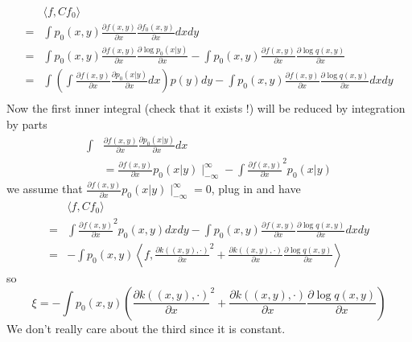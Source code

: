 \documentclass[10pt]{article}
\begin{document}
\begin{align}
&\langle f,Cf_0 \rangle \\
=& \int p_0(x,y) \frac{\partial  f(x,y)} {\partial x} \frac{\partial  f_0(x,y)} {\partial x} dx dy \\
=& \int p_0(x,y) \frac{\partial  f(x,y)} {\partial x} \frac{\partial  \log p_0(x|y)}{\partial x} - \int p_0(x,y) \frac{\partial  f(x,y)} {\partial x} \frac{\partial  \log q(x,y)}{\partial x} \\
=&  \int   \left(\int  \frac{\partial  f(x,y)} {\partial x} \frac{\partial  p_0(x|y)}{\partial x} dx \right) p(y) dy 
- \int p_0(x,y) \frac{\partial  f(x,y)} {\partial x} \frac{\partial  \log q(x,y)}{\partial x} dx dy \\
\end{align}
Now the first inner  integral (check that it exists !) will be reduced by integration by parts  
\begin{align}
\int&  \frac{\partial  f(x,y)} {\partial x} \frac{\partial  p_0(x|y)}{\partial x} dx \\
&=  \frac{\partial f(x,y)} {\partial x} p_0(x|y) \mid_{-\infty}^{\infty} - \int \frac{\partial f(x,y)} {\partial x}^2 p_0(x|y)
\end{align}
we assume that $\frac{\partial f(x,y)} {\partial x} p_0(x|y) \mid_{-\infty}^{\infty} =0$, plug in and have 
\begin{align}
&\langle f,Cf_0 \rangle \\
=&  \int   \frac{\partial f(x,y)} {\partial x}^2  p_0(x,y) dx dy - \int p_0(x,y) \frac{\partial  f(x,y)} {\partial x} \frac{\partial  \log q(x,y)}{\partial x} dx dy \\
=& -\int p_0(x,y) \left \langle f , \frac{\partial  k( (x,y), \cdot)} {\partial x}^2+ \frac{\partial  k( (x,y), \cdot)} {\partial x}\frac{\partial  \log q(x,y)}{\partial x} \right \rangle
\end{align}
so 
\begin{equation}
 \xi =-\int p_0(x,y)  \left( \frac{\partial  k( (x,y), \cdot)} {\partial x}^2+ \frac{\partial  k( (x,y), \cdot)} {\partial x}\frac{\partial  \log q(x,y)}{\partial x} \right)
\end{equation}
We don't really care about the third since it is constant.
\end{document}
